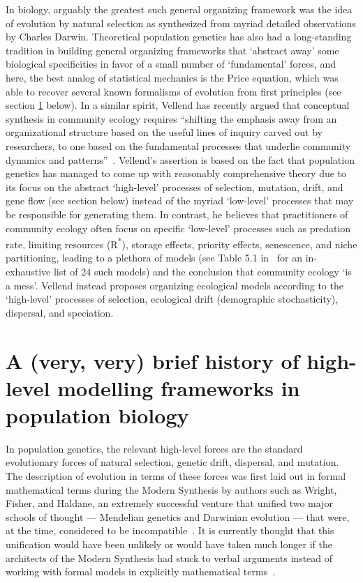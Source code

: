 In biology, arguably the greatest such general organizing framework was the idea of evolution by natural selection as synthesized from myriad detailed observations by Charles Darwin. Theoretical population genetics has also had a long-standing tradition in building general organizing frameworks that `abstract away' some biological specificities in favor of a small number of `fundamental' forces, and here, the best analog of statistical mechanics is the Price equation, which was able to recover several known formalisms of evolution from first principles (see section \ref{sec_history} below). In a similar spirit, Vellend has recently argued that conceptual synthesis in community ecology requires
``shifting the emphasis away from an organizational structure based on the useful lines of
inquiry carved out by researchers, to one based on the fundamental processes that underlie community dynamics and patterns''~\citep{vellend_theory_2016}. Vellend's assertion is based on the
fact that population genetics has managed to come up  with reasonably comprehensive theory due to its focus on the abstract `high-level’ processes of selection, mutation, drift, and
gene flow (see section below) instead of the myriad `low-level' processes that may be responsible for generating them. In contrast, he believes that practitioners of community ecology often focus on
specific `low-level' processes such as predation rate, limiting resources (R\textsuperscript{*}), storage effects,
priority effects, senescence, and niche partitioning, leading to a plethora of models (see Table
5.1 in~\cite{vellend_theory_2016} for an in-exhaustive list of 24 such models) and the conclusion that
community ecology `is a mess'. Vellend instead proposes organizing ecological models according to
 the `high-level’ processes of selection, ecological drift (demographic stochasticity), dispersal,
and speciation.

\section{A (very, very) brief history of high-level modelling frameworks in population biology}\label{sec_history}

In population genetics, the relevant high-level forces are the standard evolutionary forces of natural selection, genetic drift, dispersal, and mutation. The description of evolution in terms of these forces was first laid out in formal mathematical terms during the Modern Synthesis by authors such as Wright, Fisher, and Haldane, an extremely successful venture that unified two major schools of thought --- Mendelian genetics and Darwinian evolution --- that were, at the time, considered to be incompatible~\citep{provine_origins_2001}. It is currently thought that this unification would have been unlikely or would have taken much longer if the architects of the Modern Synthesis had stuck to verbal arguments instead of working with formal models in explicitly mathematical terms~\citep{walsh_darwins_2014}. 

